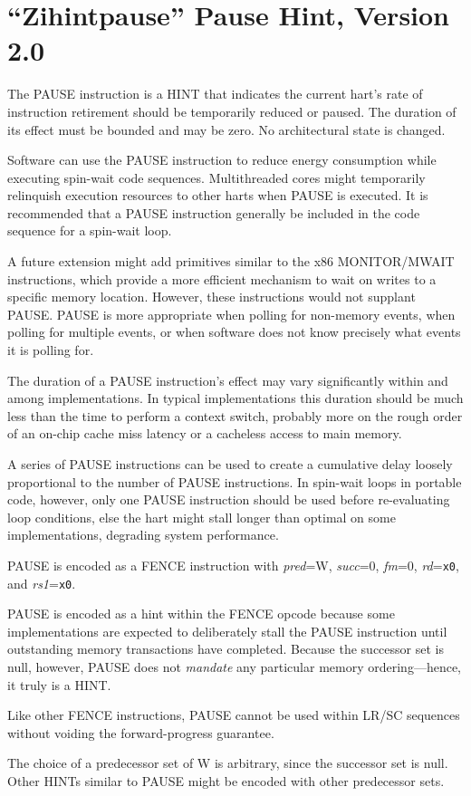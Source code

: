\chapter{``Zihintpause'' Pause Hint, Version 2.0}
\label{chap:zihintpause}

The PAUSE instruction is a HINT that indicates the current hart's rate of
instruction retirement should be temporarily reduced or paused.  The duration of its
effect must be bounded and may be zero.  No architectural state is changed.

\begin{commentary}
Software can use the PAUSE instruction to reduce energy consumption while
executing spin-wait code sequences.  Multithreaded cores might temporarily
relinquish execution resources to other harts when PAUSE is executed.
It is recommended that a PAUSE instruction generally be included in the code
sequence for a spin-wait loop.

A future extension might add primitives similar to the x86 MONITOR/MWAIT
instructions, which provide a more efficient mechanism to wait on writes to
a specific memory location.
However, these instructions would not supplant PAUSE.
PAUSE is more appropriate when polling for non-memory events, when polling for
multiple events, or when software does not know precisely what events it is
polling for.

The duration of a PAUSE instruction's effect may vary significantly within and
among implementations.
In typical implementations this duration should be much less than the time to
perform a context switch, probably more on the rough order of an on-chip cache
miss latency or a cacheless access to main memory.

A series of PAUSE instructions can be used to create a cumulative delay loosely
proportional to the number of PAUSE instructions.
In spin-wait loops in portable code, however, only one PAUSE instruction should
be used before re-evaluating loop conditions, else the hart might stall longer
than optimal on some implementations, degrading system performance.
\end{commentary}

PAUSE is encoded as a FENCE instruction with {\em pred}=W, {\em succ}=0,
{\em fm}=0, {\em rd}={\tt x0}, and {\em rs1}={\tt x0}.

\begin{commentary}
PAUSE is encoded as a hint within the FENCE opcode because some
implementations are expected to deliberately stall the PAUSE instruction until outstanding
memory transactions have completed.
Because the successor set is null, however, PAUSE does not {\em mandate} any
particular memory ordering---hence, it truly is a HINT.

Like other FENCE instructions, PAUSE cannot be used within LR/SC sequences
without voiding the forward-progress guarantee.

The choice of a predecessor set of W is arbitrary, since the successor set is
null.
Other HINTs similar to PAUSE might be encoded with other predecessor sets.
\end{commentary}
